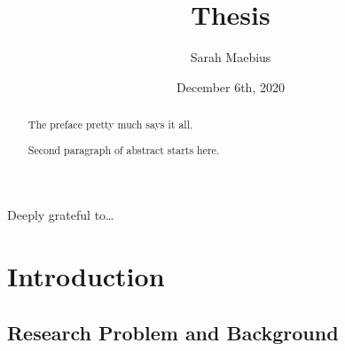 \documentclass[12pt,twoside]{reedthesis}
\title{Thesis}
\author{Sarah Maebius}
\date{December 6th, 2020}
\begin{document}
  \maketitle

\frontmatter %
\pagestyle{empty} %
  \begin{acknowledgements}
    Deeply grateful to\ldots{}
  \end{acknowledgements}

  \hypersetup{linkcolor=black}
  \setcounter{tocdepth}{2}
  \tableofcontents

  \listoftables

  \listoffigures
  \begin{abstract}
    The preface pretty much says it all.
    
    \par
    
    Second paragraph of abstract starts here.
  \end{abstract}

\mainmatter %
\pagestyle{fancyplain} %

\hypertarget{introduction}{%
\chapter*{Introduction}\label{introduction}}

\clearpage

\hypertarget{research-problem-and-background}{%
\section{Research Problem and Background}\label{research-problem-and-background}}
\end{document}
